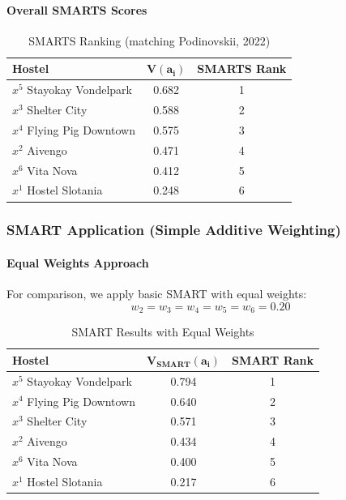 \documentclass[conference]{IEEEtran}
\begin{document}
\paragraph{Overall SMARTS Scores}

\begin{table}[H]
	\centering
	\caption{SMARTS Ranking (matching Podinovskii, 2022)}
	\label{tab:hostel_smarts_results}
	\begin{tabular}{|l|c|c|}
		\hline
		\textbf{Hostel} & $\mathbf{V(a_i)}$ & \textbf{SMARTS Rank} \\
		\hline
		$x^5$ Stayokay Vondelpark & 0.682 & 1 \\
		$x^3$ Shelter City & 0.588 & 2 \\
		$x^4$ Flying Pig Downtown & 0.575 & 3 \\
		$x^2$ Aivengo & 0.471 & 4 \\
		$x^6$ Vita Nova & 0.412 & 5 \\
		$x^1$ Hostel Slotania & 0.248 & 6 \\
		\hline
	\end{tabular}
\end{table}

\subsubsection{SMART Application (Simple Additive Weighting)}

\paragraph{Equal Weights Approach}

For comparison, we apply basic SMART with equal weights:
\begin{equation}
	w_2 = w_3 = w_4 = w_5 = w_6 = 0.20
\end{equation}

\begin{table}[H]
	\centering
	\caption{SMART Results with Equal Weights}
	\label{tab:hostel_smart_results}
	\begin{tabular}{|l|c|c|}
		\hline
		\textbf{Hostel} & $\mathbf{V_{SMART}(a_i)}$ & \textbf{SMART Rank} \\
		\hline
		$x^5$ Stayokay Vondelpark & 0.794 & 1 \\
		$x^4$ Flying Pig Downtown & 0.640 & 2 \\
		$x^3$ Shelter City & 0.571 & 3 \\
		$x^2$ Aivengo & 0.434 & 4 \\
		$x^6$ Vita Nova & 0.400 & 5 \\
		$x^1$ Hostel Slotania & 0.217 & 6 \\
		\hline
	\end{tabular}
\end{table}
\end{document}
